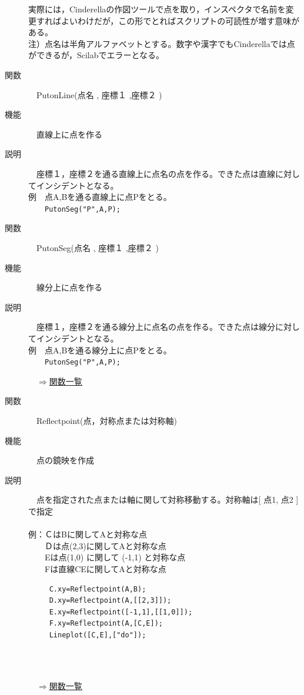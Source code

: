 \documentclass[papersize,a4paper,12pt,uplatex]{jsarticle}
\begin{document}
\begin{description}
実際には，Cinderellaの作図ツールで点を取り，インスペクタで名前を変更すればよいわけだが，この形でとればスクリプトの可読性が増す意味がある。\\
注）点名は半角アルファベットとする。数字や漢字でもCinderellaでは点ができるが，Scilabでエラーとなる。\\

\hypertarget{putonline}{}
\item[関数]　PutonLine(点名 , 座標１ ,座標２ )
\item[機能]　直線上に点を作る
\item[説明]　座標１，座標２を通る直線上に点名の点を作る。できた点は直線に対してインシデントとなる。\\
例　点A,Bを通る直線上に点Pをとる。\\
　　\verb|PutonSeg("P",A,P);|\\

\hypertarget{putonseg}{}
\item[関数]　PutonSeg(点名 , 座標１ ,座標２ )
\item[機能]　線分上に点を作る
\item[説明]　座標１，座標２を通る線分上に点名の点を作る。できた点は線分に対してインシデントとなる。\\
例　点A,Bを通る線分上に点Pをとる。\\
　　\verb|PutonSeg("P",A,P);|\\

\begin{flushright}　\hyperlink{functionlist}{$\Rightarrow$関数一覧}\end{flushright}

\hypertarget{reflextpoint}{}
\item[関数]　Reflectpoint(点，対称点または対称軸)
\item[機能]　点の鏡映を作成
\item[説明]　点を指定された点または軸に関して対称移動する。対称軸は[ 点1, 点2 ]で指定\\
　\\
例：ＣはBに関してAと対称な点\\
　　Ｄは点(2,3)に関してAと対称な点\\
　　Eは点(1,0) に関して (-1,1) と対称な点\\
　　Fは直線CEに関してAと対称な点\\
\begin{verbatim}
　　　C.xy=Reflectpoint(A,B);
　　　D.xy=Reflectpoint(A,[[2,3]]);
　　　E.xy=Reflectpoint([-1,1],[[1,0]]);
　　　F.xy=Reflectpoint(A,[C,E]);
　　　Lineplot([C,E],["do"]);
\end{verbatim}
　\\
　　　　　\\
\begin{flushright}　\hyperlink{functionlist}{$\Rightarrow$関数一覧}\end{flushright}


\end{description}
\end{document}
